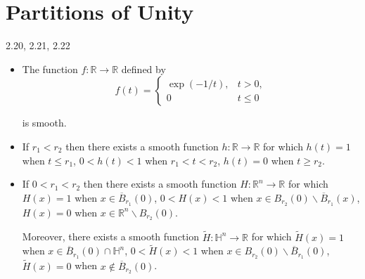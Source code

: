 \section{Partitions of Unity}

\begin{lemma}{2.20, 2.21, 2.22}
    \begin{itemize}
        \item[2.20] The function \( f: \mathbb{R} \to \mathbb{R} \) defined by
              \[
                  f(t) = \begin{cases}
                      \exp(-1/t), & t > 0,  \\
                      0           & t \le 0
                  \end{cases}
              \]

              is smooth.
        \item[2.21] If \( r_{1} < r_{2} \) then there exists a smooth function \( h: \mathbb{R} \to \mathbb{R} \) for which \( h(t) = 1 \) when \( t \le r_{1} \), \( 0 < h(t) < 1 \) when \( r_{1} < t < r_{2} \), \( h(t) = 0 \) when \( t \ge r_{2} \).
        \item[2.22] If \( 0 < r_{1} < r_{2} \) then there exists a smooth function \( H: \mathbb{R}^{n} \to \mathbb{R} \) for which \( H(x) = 1 \) when \( x \in \overline{B}_{r_{1}}(0) \), \( 0 < H(x) < 1 \) when \( x \in B_{r_{2}}(0) \smallsetminus \overline{B}_{r_{1}}(x) \), \( H(x) = 0 \) when \( x \in \mathbb{R}^{n} \smallsetminus B_{r_{2}}(0) \).

              Moreover, there exists a smooth function \( \widetilde{H}: \mathbb{H}^{n} \to \mathbb{R} \) for which \( \widetilde{H}(x) = 1 \) when \( x \in \overline{B}_{r_{1}}(0) \cap \mathbb{H}^{n} \), \( 0 < \widetilde{H}(x) < 1 \) when \( x \in B_{r_{2}}(0) \smallsetminus \overline{B}_{r_{1}}(0) \), \( \widetilde{H}(x) = 0 \) when \( x \notin \overline{B}_{r_{2}}(0) \).
    \end{itemize}
\end{lemma}


